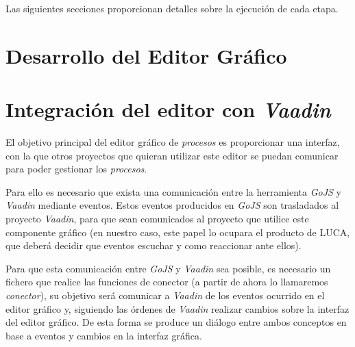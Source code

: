 Las siguientes secciones proporcionan detalles sobre la ejecución de cada etapa.

\section{Desarrollo del Editor Gráfico}







\section{Integración del editor con \emph{Vaadin}}

El objetivo principal del editor gráfico de \emph{procesos} es proporcionar una interfaz, con la que otros proyectos que quieran utilizar este editor se puedan comunicar para poder gestionar los \emph{procesos}.

Para ello es necesario que exista una comunicación entre la herramienta \emph{GoJS} y \emph{Vaadin} mediante eventos. Estos eventos producidos en \emph{GoJS} son trasladados al proyecto \emph{Vaadin}, para que sean comunicados al proyecto que utilice este componente gráfico (en nuestro caso, este papel lo ocupara el producto de LUCA, que deberá decidir que eventos escuchar y como reaccionar ante ellos).

Para que esta comunicación entre \emph{GoJS} y \emph{Vaadin} sea posible, es necesario un fichero que realice las funciones de conector (a partir de ahora lo llamaremos \emph{conector}), su objetivo será comunicar a \emph{Vaadin} de los eventos ocurrido en el editor gráfico y, siguiendo las órdenes de \emph{Vaadin} realizar cambios sobre la interfaz del editor gráfico. De esta forma se produce un diálogo entre ambos conceptos en base a eventos y cambios en la interfaz gráfica.



